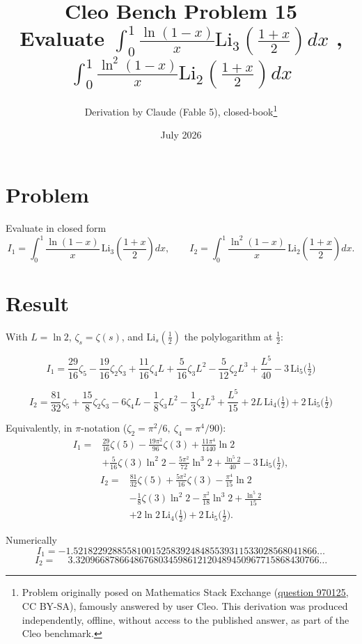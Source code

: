 \documentclass[11pt]{article}
\title{Cleo Bench Problem 15\\[1ex]\large Evaluate $\int_0^1\frac{\ln(1-x)}{x}\text{Li}_3\left(\frac{1+x}{2}\right)dx$ , $\int_0^1\frac{\ln^2(1-x)}{x}\text{Li}_2\left(\frac{1+x}{2} \right)dx$}
\author{Derivation by Claude (Fable 5), closed-book\thanks{Problem originally
posed on Mathematics Stack Exchange
(\href{https://math.stackexchange.com/q/970125}{question 970125}, CC BY-SA),
famously answered by user Cleo. This derivation was produced independently,
offline, without access to the published answer, as part of the Cleo benchmark.}}
\date{July 2026}
\theoremstyle{remark}
\begin{document}
\maketitle

\section*{Problem}

Evaluate in closed form
\[
I_1=\int_0^1\frac{\ln(1-x)}{x}\,\mathrm{Li}_3\!\left(\frac{1+x}{2}\right)dx,
\qquad
I_2=\int_0^1\frac{\ln^2(1-x)}{x}\,\mathrm{Li}_2\!\left(\frac{1+x}{2}\right)dx .
\]

\section*{Result}

With $L=\ln 2$, $\zeta_s=\zeta(s)$, and $\mathrm{Li}_s(\tfrac12)$ the polylogarithm at $\tfrac12$:

\[
\boxed{\;I_1=\frac{29}{16}\zeta_5-\frac{19}{16}\zeta_2\zeta_3+\frac{11}{16}\zeta_4 L
+\frac{5}{16}\zeta_3L^{2}-\frac{5}{12}\zeta_2L^{3}+\frac{L^{5}}{40}
-3\,\mathrm{Li}_5\!\Big(\tfrac12\Big)\;}
\]

\[
\boxed{\;I_2=\frac{81}{32}\zeta_5+\frac{15}{8}\zeta_2\zeta_3-6\zeta_4 L
-\frac18\zeta_3L^{2}-\frac13\zeta_2L^{3}+\frac{L^{5}}{15}
+2L\,\mathrm{Li}_4\!\Big(\tfrac12\Big)+2\,\mathrm{Li}_5\!\Big(\tfrac12\Big)\;}
\]

Equivalently, in $\pi$-notation ($\zeta_2=\pi^2/6,\ \zeta_4=\pi^4/90$):
\[
\begin{aligned}
I_1={}&\frac{29}{16}\zeta(5)-\frac{19\pi^2}{96}\zeta(3)+\frac{11\pi^4}{1440}\ln 2\\
&+\frac{5}{16}\zeta(3)\ln^2 2-\frac{5\pi^2}{72}\ln^3 2+\frac{\ln^5 2}{40}-3\,\mathrm{Li}_5\!\Big(\tfrac12\Big),
\end{aligned}
\]
\[
\begin{aligned}
I_2={}&\frac{81}{32}\zeta(5)+\frac{5\pi^2}{16}\zeta(3)-\frac{\pi^4}{15}\ln 2\\
&-\frac{1}{8}\zeta(3)\ln^2 2-\frac{\pi^2}{18}\ln^3 2+\frac{\ln^5 2}{15}\\
&+2\ln 2\,\mathrm{Li}_4\!\Big(\tfrac12\Big)+2\,\mathrm{Li}_5\!\Big(\tfrac12\Big).
\end{aligned}
\]

Numerically
\[
I_1=-1.52182292885581001525839248485539311533028568041866\ldots
\]
\[
I_2=\phantom{-}3.32096687866486768034598612120489450967715868430766\ldots
\]
\end{document}
